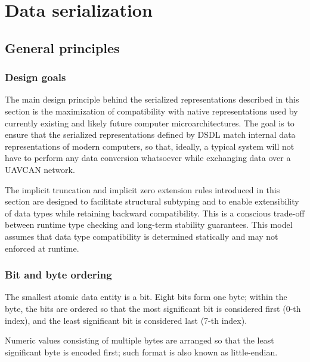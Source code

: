 \section{Data serialization}\label{sec:dsdl_data_serialization}

\newcommand{\hugett}[1]{\texttt{\huge{#1}}}

\subsection{General principles}

\subsubsection{Design goals}

The main design principle behind the serialized representations described in this section is
the maximization of compatibility with native representations used by currently existing and
likely future computer microarchitectures.
The goal is to ensure that the serialized representations defined by DSDL match internal data representations of
modern computers, so that, ideally, a typical system will not have to perform any data conversion whatsoever while
exchanging data over a UAVCAN network.

The implicit truncation and implicit zero extension rules introduced in this section are designed to
facilitate structural subtyping and to enable extensibility of data types while retaining backward compatibility.
This is a conscious trade-off between runtime type checking and long-term stability guarantees.
This model assumes that data type compatibility is determined statically and may not enforced at runtime.

\subsubsection{Bit and byte ordering}

The smallest atomic data entity is a bit.
Eight bits form one byte;
within the byte, the bits are ordered so that the most significant bit is considered first (0-th index),
and the least significant bit is considered last (7-th index).

Numeric values consisting of multiple bytes are arranged so that the least significant byte is encoded first;
such format is also known as little-endian.

